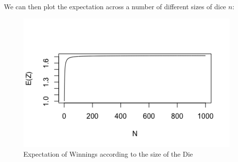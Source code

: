 \documentclass[12pt]{article}
\begin{document}
We can then plot the expectation across a number of different sizes of dice $n$:


\begin{figure}[H]
	\begin{center}
		\includegraphics[scale=0.90]{../plots/dice}
		\caption{Expectation of Winnings according to the size of the Die}
	\end{center}
\end{figure}
\end{document}
